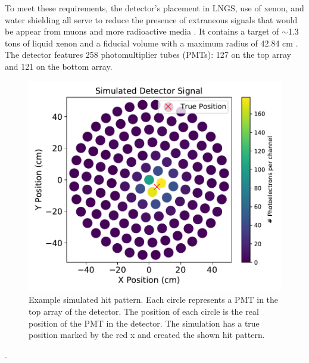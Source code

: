\documentclass[thesis.tex]{subfiles}
\begin{document}
To meet these requirements, the detector's placement in LNGS, use of xenon, and water shielding all serve to reduce the presence of extraneous signals that would be appear from muons and more radioactive media \cite{Xenon1t}.
It contains a target of $\sim$1.3 tons of liquid xenon and a fiducial volume with a maximum radius of 42.84 cm \cite{1TDM_DataAnalysis}.
The detector features 258 photomultiplier tubes (PMTs): 127 on the top array and 121 on the bottom array.
\begin{figure}
	\centering
	\includegraphics[width=\linewidth]{figures/opt_sim_hit_989.pdf}
	\caption{Example simulated hit pattern.
	Each circle represents a PMT in the top array of the detector.
	The position of each circle is the real position of the PMT in the detector.
	The simulation has a true position marked by the red x and created the shown hit pattern.}
	\label{fig:example_hit}
\end{figure}
 \cite{Xenon1t}.
\end{document}
